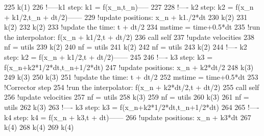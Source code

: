 \begin{DoxyCode}
225         k(1)%
226         \textcolor{comment}{!-----k1 step: k1 = f(x\_n,t\_n)-----}
227 
228         \textcolor{comment}{!---- k2 step: k2 = f(x\_n + k1/2,t\_n + dt/2)------}
229         \textcolor{comment}{!update positions:  x\_n + k1./2*dt}
230         k(2)%
231         k(2)%
232         k(2)%
233         \textcolor{comment}{!update the time: t + dt/2}
234         mstime = time+0.5*dt
235         \textcolor{comment}{!run the interpolator: f(x\_n + k1/2,t + dt/2)}
236         \textcolor{keyword}{call }self%
237         \textcolor{comment}{!update velocities}
238         nf = utils%
239         k(2)%
240         nf = utils%
241         k(2)%
242         nf = utils%
243         k(2)%
244         \textcolor{comment}{!---- k2 step: k2 = f(x\_n + k1/2,t + dt/2)------}
245 
246         \textcolor{comment}{!---- k3 step: k3 = f(x\_n+k2*1/2*dt,t\_n+1/2*dt)}
247         \textcolor{comment}{!update positions: x\_n + k2*dt/2}
248         k(3)%
249         k(3)%
250         k(3)%
251         \textcolor{comment}{!update the time: t + dt/2}
252         mstime = time+0.5*dt
253         \textcolor{comment}{!Corrector step}
254         \textcolor{comment}{!run the interpolator: f(x\_n + k2*dt/2,t + dt/2)}
255         \textcolor{keyword}{call }self%
256         \textcolor{comment}{!update velocities}
257         nf = utils%
258         k(3)%
259         nf = utils%
260         k(3)%
261         nf = utils%
262         k(3)%
263         \textcolor{comment}{!---- k3 step: k3 = f(x\_n+k2*1/2*dt,t\_n+1/2*dt)}
264 
265         \textcolor{comment}{!---- k4 step: k4 = f(x\_n + k3,t + dt)------}
266         \textcolor{comment}{!update positions: x\_n + k3*dt}
267         k(4)%
268         k(4)%
269         k(4)%

\end{DoxyCode}
